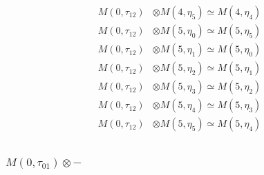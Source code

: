 \begin{align*}
M(0,\tau_{12}) &\otimes M(4,\eta_{5}) \simeq M(4,\eta_{4}) \\
M(0,\tau_{12}) &\otimes M(5,\eta_{0}) \simeq M(5,\eta_{5}) \\
M(0,\tau_{12}) &\otimes M(5,\eta_{1}) \simeq M(5,\eta_{0}) \\
M(0,\tau_{12}) &\otimes M(5,\eta_{2}) \simeq M(5,\eta_{1}) \\
M(0,\tau_{12}) &\otimes M(5,\eta_{3}) \simeq M(5,\eta_{2}) \\
M(0,\tau_{12}) &\otimes M(5,\eta_{4}) \simeq M(5,\eta_{3}) \\
M(0,\tau_{12}) &\otimes M(5,\eta_{5}) \simeq M(5,\eta_{4}) \\
\end{align*}

\subsubsection{$ M(0,\tau_{01})\otimes -$}
